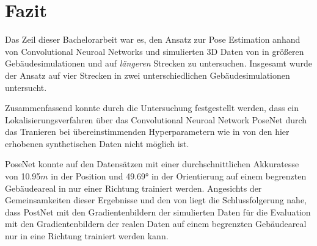 
\section{Fazit}
\label{sec:kapitel_6}
Das Zeil dieser Bachelorarbeit war es, den Ansatz zur Pose Estimation anhand von Convolutional Neuroal Networks und simulierten 3D Daten von \citet{acharyaBIMPoseNetIndoorCamera2019} in größeren Gebäudesimulationen und auf \textit{längeren} Strecken zu untersuchen.
Insgesamt wurde der Ansatz auf vier Strecken in zwei unterschiedlichen Gebäudesimulationen untersucht. 

Zusammenfassend konnte durch die Untersuchung festgestellt werden, dass ein Lokalisierungsverfahren über das Convolutional Neuroal Network PoseNet durch das Tranieren bei übereinstimmenden Hyperparametern wie in \cite{acharyaBIMPoseNetIndoorCamera2019} von den hier erhobenen synthetischen Daten nicht möglich ist. 

PoseNet konnte auf den Datensätzen mit einer durchschnittlichen Akkuratesse von 10.95$m$ in der Position und 49.69° in der Orientierung auf einem begrenzten Gebäudeareal in nur einer Richtung trainiert werden. Angesichts der Gemeinsamkeiten dieser Ergebnisse und den von \citet{acharyaBIMPoseNetIndoorCamera2019} liegt die Schlussfolgerung nahe, dass PostNet mit den Gradientenbildern der simulierten Daten für die Evaluation mit den Gradientenbildern der realen Daten auf einem begrenzten Gebäudeareal nur in eine Richtung trainiert werden kann.